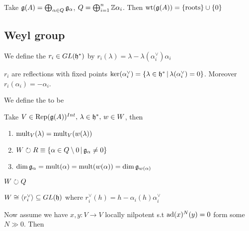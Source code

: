 \documentclass{article}
\begin{document}
\begin{example}
Take $\mathfrak{g}(A) = \bigoplus_{\alpha \in Q} \mathfrak{g}_\alpha$, $Q = \bigoplus_{i=1}^n \mathbb{Z} \alpha_i$. Then $\operatorname{wt}(\mathfrak{g}(A)) = \left\{ \text{roots} \right\}\cup\left\{ 0 \right\}$ 
\end{example}


\subsection{Weyl group}

\begin{definition}
We define the  $r_i \in GL(\mathfrak{h}^\ast)$ by $r_i(\lambda) = \lambda - \lambda(\alpha_i^\vee) \alpha_i$
\end{definition}

\begin{prop}
$r_i$ are reflections with fixed points $\ker(\alpha_i^\vee) = \left\{ \lambda \in \mathfrak{h}^\ast \, | \, \lambda(\alpha_i^\vee) = 0 \right\}$. Moreover $r_i(\alpha_i) = -\alpha_i$. 
\end{prop}

\begin{definition}
We define the  to be 
\end{definition}

\begin{prop}
Take $V \in \operatorname{Rep}(\mathfrak{g}(A))^{Int}, \, \lambda \in \mathfrak{h}^\ast, \, w \in W$, then \begin{enumerate}
    \item $\operatorname{mult}_V(\lambda) = \operatorname{mult}_V(w(\lambda))$
    \item $W \circlearrowright R \equiv \left\{ \alpha \in Q\setminus 0  \, | \, \mathfrak{g}_\alpha \neq 0 \right\} $
    \item $\dim\mathfrak{g}_\alpha = \operatorname{mult}(\alpha) = \operatorname{mult}(w(\alpha)) = \dim\mathfrak{g}_{w(\alpha)}$
\end{enumerate}
\end{prop}

\begin{remark}
$W \circlearrowright Q$
\end{remark}

\begin{ex}
$W \cong \left\langle r_i^\vee \right\rangle \subseteq GL(\mathfrak{h})$ where $r_i^\vee(h) = h - \alpha_i(h) \alpha_i^\vee$
\end{ex}

Now assume we have $x,y:V \to V$ locally nilpotent s.t $\operatorname{ad}(x)^N(y) = 0$ form some $N \gg 0$. Then 
\end{document}
